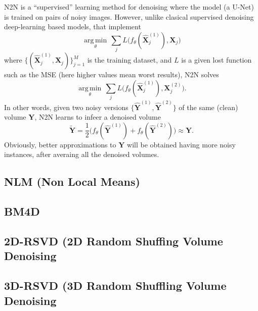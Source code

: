 \documentclass{article}
\begin{document}
N2N is a ``supervised'' learning method for denoising where the model
(a U-Net) is trained on pairs of noisy images. However, unlike
clasical supervised denoising deep-learning based models, that
implement
\begin{equation}
  \underset{\theta}{\operatorname{arg\,min}} \, \sum_j L \big(f_\theta(\hat{\mathbf X}_j^{(1)}), {\mathbf X}_j\big)
\end{equation}
where $\{(\hat{\mathbf X}_j^{(1)}, {\mathbf X}_j)\}_{j=1}^M$ is the training
dataset, and $L$ is a given lost function such as the MSE (here higher
values mean worst results), N2N solves
\begin{equation}
  \underset{\theta}{\operatorname{arg\,min}} \, \sum_j L \big(f_\theta(\hat{\mathbf X}_j^{(1)}), {\mathbf X}_j^{(2)}\big).
\end{equation}
In other words, given two noisy versions
$\{\hat{\mathbf Y}^{(1)}, \hat{\mathbf Y}^{(2)}\}$ of the same (clean)
volume ${\mathbf Y}$, N2N learns to infeer a denoised volume
\begin{equation}
  \tilde{\mathbf Y}=\frac{1}{2}\big(f_\theta(\hat{\mathbf Y}^{(1)})+f_\theta(\hat{\mathbf Y}^{(2)})\big)\approx{\mathbf Y}.
\end{equation}
Obviously, better approximations to ${\mathbf Y}$ will be obtained
having more noisy instances, after averaing all the denoised volumes.

\subsection{NLM (Non Local Means)} 

\subsection{BM4D}

\subsection{2D-RSVD (2D Random Shuffing Volume Denoising}

\subsection{3D-RSVD (3D Random Shuffling Volume Denoising}




\end{document}
